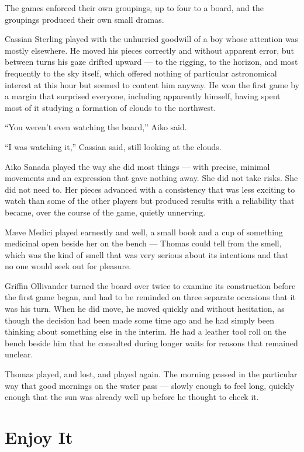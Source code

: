 The games enforced their own groupings, up to four to a board, and the groupings produced their own small dramas.

Cassian Sterling played with the unhurried goodwill of a boy whose attention was mostly elsewhere. He moved his pieces correctly and without apparent error, but between turns his gaze drifted upward --- to the rigging, to the horizon, and most frequently to the sky itself, which offered nothing of particular astronomical interest at this hour but seemed to content him anyway. He won the first game by a margin that surprised everyone, including apparently himself, having spent most of it studying a formation of clouds to the northwest.

\enquote{You weren't even watching the board,} Aiko said.

\enquote{I was watching it,} Cassian said, still looking at the clouds.

Aiko Sanada played the way she did most things --- with precise, minimal movements and an expression that gave nothing away. She did not take risks. She did not need to. Her pieces advanced with a consistency that was less exciting to watch than some of the other players but produced results with a reliability that became, over the course of the game, quietly unnerving.

Mæve Medici played earnestly and well, a small book and a cup of something medicinal open beside her on the bench --- Thomas could tell from the smell, which was the kind of smell that was very serious about its intentions and that no one would seek out for pleasure.

Griffin Ollivander turned the board over twice to examine its construction before the first game began, and had to be reminded on three separate occasions that it was his turn. When he did move, he moved quickly and without hesitation, as though the decision had been made some time ago and he had simply been thinking about something else in the interim. He had a leather tool roll on the bench beside him that he consulted during longer waits for reasons that remained unclear.

Thomas played, and lost, and played again. The morning passed in the particular way that good mornings on the water pass --- slowly enough to feel long, quickly enough that the sun was already well up before he thought to check it.

\section*{Enjoy It}

